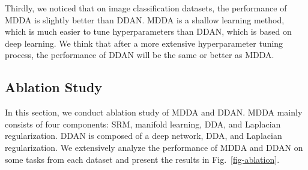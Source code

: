 \documentclass[acmsmall]{acmart}
\begin{document}
Thirdly, we noticed that on image classification datasets, the performance of MDDA is slightly better than DDAN. MDDA is a shallow learning method, which is much easier to tune hyperparameters than DDAN, which is based on deep learning. We think that after a more extensive hyperparameter tuning process, the performance of DDAN will be the same or better as MDDA.

\begin{table}[t!]
	\caption{Comparison of the performance between our evaluation of  and average search (AVSE). Suppose the results of grid search are 0.}
	\label{tb-mu}
\vspace{-.1in}
\end{table}

\begin{figure*}[t!]
	\centering
	\hspace{-.1in}
	\hspace{-.1in}
	\vspace{-.2in}
	\caption{Ablation study of MDDA and DDAN. `M' denotes manifold learning, and `Lap' denotes Laplace regularization.}
	\label{fig-ablation}
	\vspace{-.2in}
\end{figure*}

\subsection{Ablation Study}

In this section, we conduct ablation study of MDDA and DDAN. MDDA mainly consists of four components: SRM, manifold learning, DDA, and Laplacian regularization. DDAN is composed of a deep network, DDA, and Laplacian regularization. We extensively analyze the performance of MDDA and DDAN on some tasks from each dataset and present the results in Fig.~\ref{fig-ablation}. 
\end{document}
